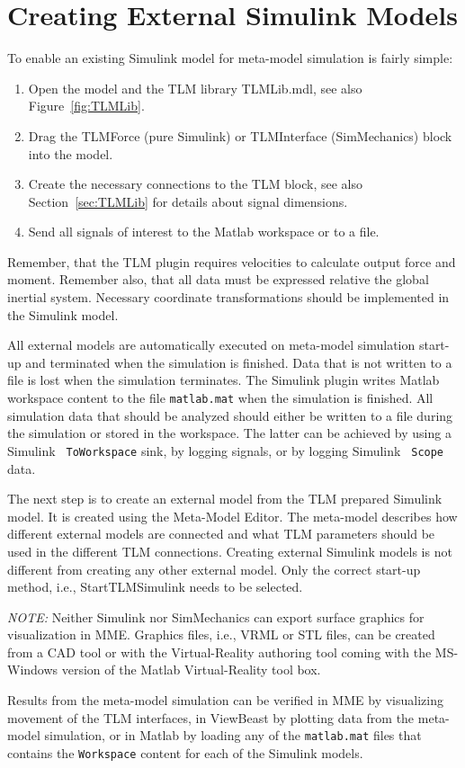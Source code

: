 \section{Creating External Simulink Models}
To enable an existing Simulink model for meta-model simulation is
fairly simple:
\begin{enumerate}
\item Open the model and the TLM library TLMLib.mdl, see also Figure~\ref{fig:TLMLib}.
\item Drag the TLMForce (pure Simulink) or TLMInterface (SimMechanics)
	block into the model.
\item Create the necessary connections to the TLM block, see also
	Section~\ref{sec:TLMLib} for details about signal dimensions.
\item Send all signals of interest to the Matlab workspace or to a file.
\end{enumerate}

Remember, that the TLM plugin requires velocities to calculate output
force and moment. Remember also, that all data must be expressed
relative the global inertial system. Necessary coordinate
transformations should be implemented in the Simulink model.

All external models are automatically executed on meta-model
simulation start-up and terminated when the simulation is
finished. Data that is not written to a file is lost when the
simulation terminates. The Simulink plugin writes Matlab workspace
content to the file {\tt matlab.mat} when the simulation is
finished. All simulation data that should be analyzed should either be
written to a file during the simulation or stored in the
workspace. The latter can be achieved by using a Simulink {\tt
ToWorkspace} sink, by logging signals, or by logging Simulink {\tt
Scope} data.

The next step is to create an external model from the TLM prepared
Simulink model. It is created using the Meta-Model Editor. The
meta-model describes how different external models are connected and
what TLM parameters should be used in the different TLM
connections. Creating external Simulink models is not different from
creating any other external model. Only the correct start-up method,
i.e., StartTLMSimulink needs to be selected.

{\em NOTE:} Neither Simulink nor SimMechanics can export surface
graphics for visualization in MME. Graphics files, i.e., VRML or
STL files, can be created from a CAD tool or with the Virtual-Reality
authoring tool coming with the MS-Windows version of the Matlab
Virtual-Reality tool box.

Results from the meta-model simulation can be verified in MME by
visualizing movement of the TLM interfaces, in ViewBeast by plotting
data from the meta-model simulation, or in Matlab by loading any of
the {\tt matlab.mat} files that contains the {\tt Workspace} content
for each of the Simulink models.
